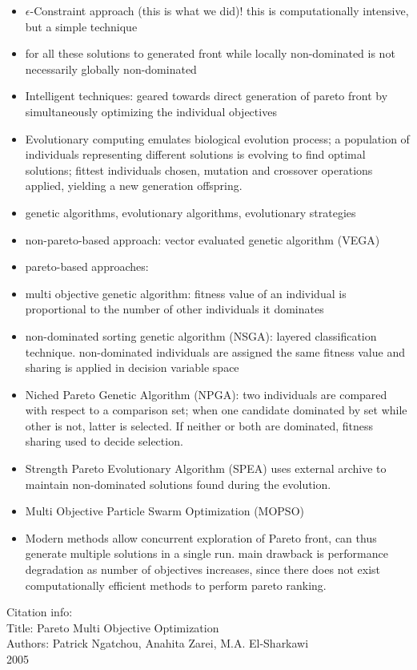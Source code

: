 \documentclass{article}
\begin{document}
\begin{itemize}
\item $\epsilon$-Constraint approach (this is what we did)! this is computationally intensive, but a simple technique
\item for all these solutions to generated front while locally non-dominated is not necessarily globally non-dominated
\item Intelligent techniques: geared towards direct generation of pareto front by simultaneously optimizing the individual objectives
\item Evolutionary computing emulates biological evolution process; a population of individuals representing different solutions is evolving to find optimal solutions; fittest individuals chosen, mutation and crossover operations applied, yielding a new generation offspring.
\item genetic algorithms, evolutionary algorithms, evolutionary strategies
\item non-pareto-based approach: vector evaluated genetic algorithm (VEGA)
\item pareto-based approaches: 
\item multi objective genetic algorithm: fitness value of an individual is proportional to the number of other individuals it dominates
\item non-dominated sorting genetic algorithm (NSGA): layered classification technique. non-dominated individuals are assigned the same fitness value and sharing is applied in decision variable space
\item Niched Pareto Genetic Algorithm (NPGA): two individuals are compared with respect to a comparison set; when one candidate dominated by set while other is not, latter is selected. If neither or both are dominated, fitness sharing used to decide selection.
\item Strength Pareto Evolutionary Algorithm (SPEA) uses external archive to maintain non-dominated solutions found during the evolution.
\item Multi Objective Particle Swarm Optimization (MOPSO)
\item Modern methods allow concurrent exploration of Pareto front, can thus generate multiple solutions in a single run. main drawback is performance degradation as number of objectives increases, since there does not exist computationally efficient methods to perform pareto ranking.
\end{itemize}
Citation info: \\
Title: Pareto Multi Objective Optimization \\
Authors: Patrick Ngatchou, Anahita Zarei, M.A. El-Sharkawi \\
2005
\end{document}
